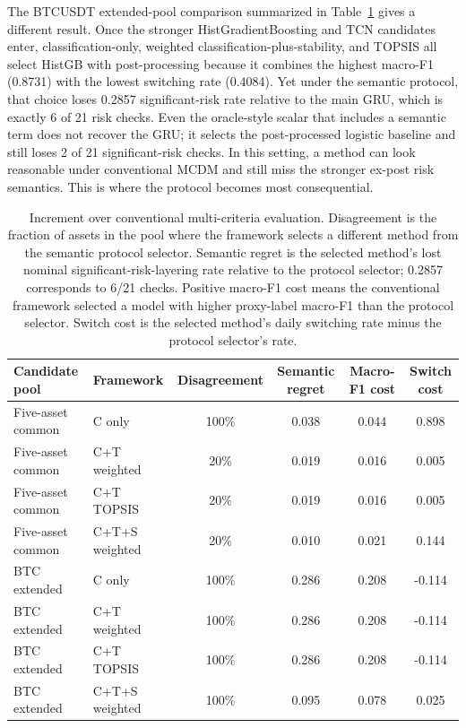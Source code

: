 \documentclass[a4paper,fleqn]{cas-dc}
\begin{document}
The BTCUSDT extended-pool comparison summarized in Table~\ref{tab:framework-increment} gives a different result. Once the stronger HistGradientBoosting and TCN candidates enter, classification-only, weighted classification-plus-stability, and TOPSIS all select HistGB with post-processing because it combines the highest macro-F1 (0.8731) with the lowest switching rate (0.4084). Yet under the semantic protocol, that choice loses 0.2857 significant-risk rate relative to the main GRU, which is exactly 6 of 21 risk checks. Even the oracle-style scalar that includes a semantic term does not recover the GRU; it selects the post-processed logistic baseline and still loses 2 of 21 significant-risk checks. In this setting, a method can look reasonable under conventional MCDM and still miss the stronger ex-post risk semantics. This is where the protocol becomes most consequential.

\begin{table}[t]
\caption{Increment over conventional multi-criteria evaluation. Disagreement is the fraction of assets in the pool where the framework selects a different method from the semantic protocol selector. Semantic regret is the selected method's lost nominal significant-risk-layering rate relative to the protocol selector; 0.2857 corresponds to 6/21 checks. Positive macro-F1 cost means the conventional framework selected a model with higher proxy-label macro-F1 than the protocol selector. Switch cost is the selected method's daily switching rate minus the protocol selector's rate.}
\label{tab:framework-increment}
\centering
\scriptsize
\setlength{\tabcolsep}{4pt}
\begin{tabular}{llcccc}
\toprule
Candidate pool & Framework & Disagreement & Semantic regret & Macro-F1 cost & Switch cost \\
\midrule
Five-asset common & C only & 100\% & 0.038 & 0.044 & 0.898 \\
Five-asset common & C+T weighted & 20\% & 0.019 & 0.016 & 0.005 \\
Five-asset common & C+T TOPSIS & 20\% & 0.019 & 0.016 & 0.005 \\
Five-asset common & C+T+S weighted & 20\% & 0.010 & 0.021 & 0.144 \\
\midrule
BTC extended & C only & 100\% & 0.286 & 0.208 & -0.114 \\
BTC extended & C+T weighted & 100\% & 0.286 & 0.208 & -0.114 \\
BTC extended & C+T TOPSIS & 100\% & 0.286 & 0.208 & -0.114 \\
BTC extended & C+T+S weighted & 100\% & 0.095 & 0.078 & 0.025 \\
\bottomrule
\end{tabular}
\end{table}
\end{document}
